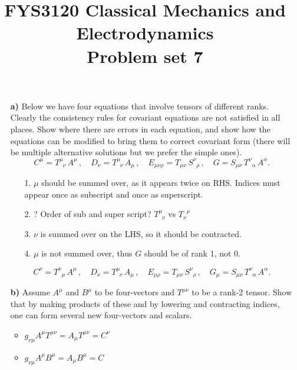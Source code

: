 \documentclass[11pt,a4paper]{report}
\title{FYS3120 Classical Mechanics and Electrodynamics\\ 
\vspace{15mm}Problem set 7}
\newcounter{excount}[chapter]
\newenvironment{exercise}[1][]{\addtocounter{excount}{1} \noindent {\bf Problem
    \arabic{excount} \ \ #1}\hspace{2mm}}{\vspace{4mm}}
\begin{document}
\maketitle


\begin{exercise}
\begin{itemize}
\item[\bf a)] Below we have four equations that involve tensors of different ranks. Clearly the consistency rules for covariant equations are not satisfied in all places. Show where there are errors in each equation, and show how the equations can be modified to bring them to correct covariant form (there will be multiple alternative solutions but we prefer the simple ones).
\begin{equation}
C^{\mu}=T^{\mu}_{\;\;\nu}\, A^{\mu}\,,\quad D_{\nu}=T^{\mu}_{\;\;\nu} \,A_{\mu}\,,\quad
E_{\mu\nu\rho}=T_{\mu\nu}\,S^{\nu}_{\;\;\rho}\,,\quad G=S_{\mu\nu}\,T^{\nu}_{\;\;\alpha}\, A^{\alpha}.
\end{equation}
\begin{itemize}
\item[1.]$\mu$ should be summed over, as it appears twice on RHS. Indices must appear once as subscript and once as superscript. 
\item[2.]
? Order of sub and super script? $T^{\mu}_{\;\;\nu}$ vs $T_{\nu}^{\;\;\mu} $
\item[3.]
$\nu$ is summed over on the LHS, so it should be contracted.

\item[4.]
$\mu$ is not summed over, thus $G$ should be of rank 1, not 0.
\end{itemize}
\begin{equation}
C^{\nu}=T^{\nu}_{\;\;\mu}\, A^{\mu}\,,\quad D_{\nu}=T^{\mu}_{\;\;\nu} \,A_{\mu}\,,\quad
E_{\mu\rho}=T_{\mu\nu}\,S^{\nu}_{\;\;\rho}\,,\quad G_{\mu}=S_{\mu\nu}\,T^{\nu}_{\;\;\alpha}\, A^{\alpha}.
\end{equation}

\item[\bf b)] Assume $A^\mu$ and $B^\mu$  to be four-vectors and $T^{\mu\nu}$ to be a rank-2 tensor. Show that by making products of these and by lowering and contracting indices, one can form several new four-vectors and scalars.
\begin{itemize}
\item $g_{\nu \mu} A^\mu T^{\mu\nu}=A_{\mu} T^{\mu\nu}=C^{\nu}$ 
\item $g_{\nu \mu} A^\mu B^\mu=A_{\mu} B^\mu=C$ 
\end{itemize}




\end{itemize}
\end{exercise}
\end{document}
